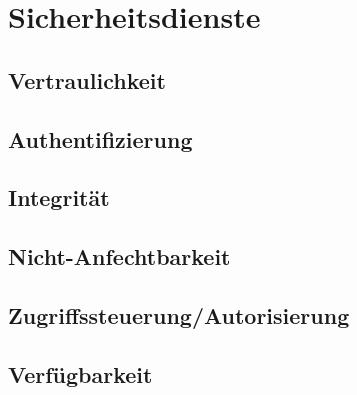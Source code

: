 \chapter{Sicherheitsdienste}\label{Sicherheitsdienste}
\section{Vertraulichkeit}
\section{Authentifizierung}
\section{Integrität}
\section{Nicht-Anfechtbarkeit}
\section{Zugriffssteuerung/Autorisierung}
\section{Verfügbarkeit}